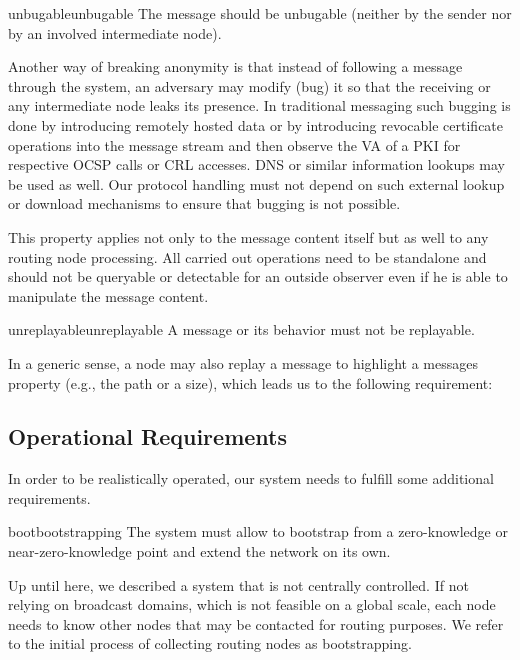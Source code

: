 \begin{requirement}{unbugable}{unbugable}
	The message should be unbugable (neither by the sender nor by an involved intermediate node).
\end{requirement}

Another way of breaking anonymity is that instead of following a message through the system, an adversary may modify (bug) it so that the receiving or any intermediate node leaks its presence. In traditional messaging such bugging is done by introducing remotely hosted data or by introducing revocable certificate operations into the message stream and then observe the VA of a PKI for respective OCSP calls or CRL accesses. DNS or similar information lookups may be used as well. Our protocol handling must not depend on such external lookup or download mechanisms to ensure that bugging is not possible.

This property applies not only to the message content itself but as well to any routing node processing. All carried out operations need to be standalone and should not be queryable or detectable for an outside observer even if he is able to manipulate the message content.

\begin{requirement}{unreplayable}{unreplayable}
	A message or its behavior must not be replayable.
\end{requirement}

In a generic sense, a node may also replay a message to highlight a messages property (e.g., the path or a size), which leads us to the following requirement:%

\subsection{Operational Requirements}
In order to be realistically operated, our system needs to fulfill some additional requirements.

\begin{requirement}{boot}{bootstrapping}
	The system must allow to bootstrap from a zero-knowledge or near-zero-knowledge point and extend the network on its own. 
\end{requirement}
Up until here, we described a system that is not centrally controlled. If not relying on broadcast domains, which is not feasible on a global scale, each node needs to know other nodes that may be contacted for routing purposes. We refer to the initial process of collecting routing nodes as bootstrapping.

